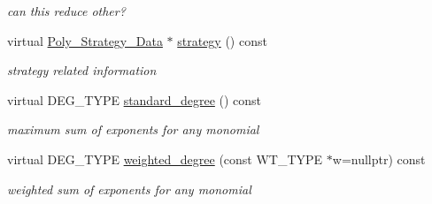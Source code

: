 \begin{Indent}
\begin{DoxyCompactItemize}
\begin{DoxyCompactList}\small\item\em can {\ttfamily this} reduce {\ttfamily other}? \end{DoxyCompactList}\item 
\mbox{\label{class_abstract___polynomial_a3b7b27fc293408d0d34d60dc6a090c79}} 
virtual \hyperlink{class_poly___strategy___data}{Poly\+\_\+\+Strategy\+\_\+\+Data} $\ast$ \hyperlink{class_abstract___polynomial_a3b7b27fc293408d0d34d60dc6a090c79}{strategy} () const
\begin{DoxyCompactList}\small\item\em strategy related information \end{DoxyCompactList}\item 
\mbox{\label{class_abstract___polynomial_aa619f56a2df5d0077335709ac11de039}} 
virtual D\+E\+G\+\_\+\+T\+Y\+PE \hyperlink{class_abstract___polynomial_aa619f56a2df5d0077335709ac11de039}{standard\+\_\+degree} () const
\begin{DoxyCompactList}\small\item\em maximum sum of exponents for any monomial \end{DoxyCompactList}\item 
virtual D\+E\+G\+\_\+\+T\+Y\+PE \hyperlink{class_abstract___polynomial_a231aa84c74183943142952d8035b1943}{weighted\+\_\+degree} (const W\+T\+\_\+\+T\+Y\+PE $\ast$w=nullptr) const
\begin{DoxyCompactList}\small\item\em weighted sum of exponents for any monomial \end{DoxyCompactList}\end{DoxyCompactItemize}
\end{Indent}

